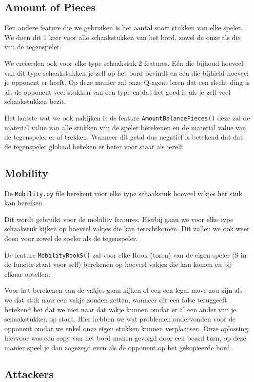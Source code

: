 \documentclass[a4paper,openany]{uantwerpenassignment}
\newcommand{\codeword}[1]{
    \colorbox{code}{\texttt{\textcolor{codetext}{#1}}}
}
\begin{document}
\subsection{Amount of Pieces}
Een andere feature die we gebruiken is het aantal soort stukken van elke speler. We doen dit 1 keer voor alle schaakstukken van het bord, zowel de onze als die van de tegenspeler. 

We creëerden ook voor elke type schaakstuk 2 features. Eén die bijhoud hoeveel van dit type schaakstukken je zelf op het bord bevindt en één die bijhield hoeveel je opponent er heeft. Op deze manier zal onze Q-agent leren dat een slecht ding is als de opponent veel stukken van een type en dat het goed is als je zelf veel schaakstukken bezit.

Het laatste wat we ook nakijken is de feature \codeword{AmountBalancePieces()} deze zal de material value van alle stukken van de speler berekenen en de material value van de tegenspeler er af trekken. Wanneer dit getal dus negatief is betekend dat dat de tegenspeler globaal bekeken er beter voor staat als jezelf.

\subsection{Mobility}
De \codeword{Mobility.py} file berekent voor elke type schaakstuk hoeveel vakjes het stuk kan bereiken. 

Dit wordt gebruikt voor de mobility features. Hierbij gaan we voor elke type schaakstuk kijken op hoeveel vakjes die kan terechtkomen. Dit zullen we ook weer doen voor zowel de speler als de tegenspeler.

De feature \codeword{MobilityRookS()} zal voor elke Rook (toren) van de eigen speler (S in de functie staat voor self) berekenen op hoeveel vakjes die kan komen en bij elkaar optellen.

Voor het berekenen van de vakjes gaan kijken of een een legal move zou zijn als we dat stuk naar een vakje zouden zetten, wanneer dit een false teruggeeft betekend het dat we niet naar dat vakje kunnen omdat er al een ander van je schaakstukken op staat. Hier hebben we wat problemen ondervonden voor de opponent omdat we enkel onze eigen stukken kunnen verplaatsen. Onze oplossing hiervoor was een copy van het bord maken gevolgd door een board turn, op deze manier speel je dan zogezegd even als de opponent op het gekopieerde bord. 

\subsection{Attackers}
\end{document}
